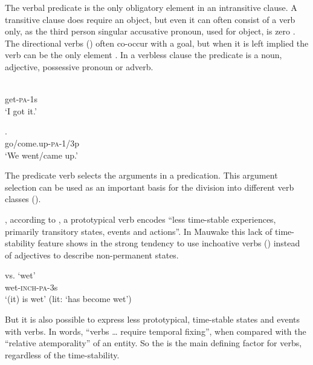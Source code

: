 The verbal predicate is the only obligatory element in an intransitive clause. A transitive clause does require an object, but even it can often consist of a verb only, as the third person singular accusative pronoun, used for object, is zero . The directional verbs () often co-occur with a goal, but when it is left implied the verb can be the only element . In a verbless clause the predicate is a noun, adjective, possessive pronoun or adverb. 

\ea%
\label{ex:3:x177}
\gll {} \\
get-\textsc{pa}-1s\\
\glt`I got it.'
\z

\ea%
\label{ex:3:x178}
\gll {}. \\
go/come.up-\textsc{pa}-1/3p \\
\glt`We went/came up.' 
\z

The predicate verb selects the arguments in a predication. This argument selection can be used as an important basis for the division into different verb classes ().

, according to \citet[64]{Givon1984}, a prototypical verb encodes ``{less time-stable experiences, primarily transitory states, events and actions}''. In Mauwake this lack of time-stability feature shows in the strong tendency to use inchoative verbs  () instead of adjectives to describe non-permanent states. 

\ea%
\label{ex:3:x179}
\gll {} vs.  `wet' \\
wet-\textsc{inch}-\textsc{pa}-3s \\
\glt`(it) is wet' (lit: `has become wet') 
\z

But it is also possible to express less prototypical, time-stable states and events with verbs. In  words, ``{verbs {\dots} require temporal fixing''}, when compared with the ``{relative atemporality}'' of an entity. So the  is the main defining factor for verbs, regardless of the time-stability.

